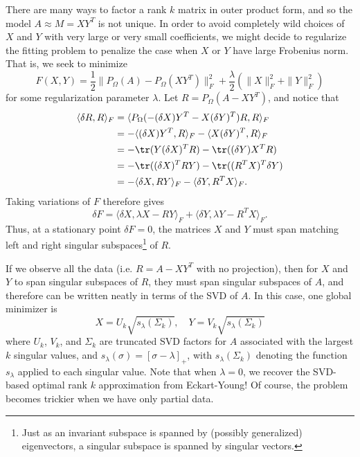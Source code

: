 \documentclass[12pt, leqno]{article} %
\begin{document}
There are many ways to factor a rank $k$ matrix in outer product
form, and so the model $A \approx M = XY^T$ is not unique.  In order
to avoid completely wild choices of $X$ and $Y$ with very large
or very small coefficients, we might decide to regularize the
fitting problem to penalize the case when $X$ or $Y$ have large
Frobenius norm.  That is, we seek to minimize
\[
  F(X,Y) =
    \frac{1}{2} \|P_{\Omega}(A)-P_{\Omega}(XY^T)\|_F^2 +
    \frac{\lambda}{2} \left( \|X\|_F^2 + \|Y\|_F^2 \right)
\]
for some regularization parameter $\lambda$.  Let
$R = P_{\Omega}(A-XY^T)$, and notice that
\begin{align*}
  \langle \delta R, R \rangle_F
  &= \langle P_{\Omega}(-(\delta X) Y^T - X(\delta Y)^T ) R, R \rangle_F \\
  &= -\langle (\delta X) Y^T, R \rangle_F -\langle X (\delta Y)^T, R \rangle_F \\
  &= -\tr(Y (\delta X)^T R)-\tr((\delta Y) X^T R) \\
  &= -\tr((\delta X)^T RY)-\tr((R^TX)^T \delta Y) \\
  &= -\langle \delta X, RY \rangle_F - \langle \delta Y, R^T X \rangle_F.
\end{align*}
Taking variations of $F$ therefore gives
\[
  \delta F =
    \langle \delta X, \lambda X - R   Y \rangle_F +
    \langle \delta Y, \lambda Y - R^T X \rangle_F.
\]
Thus, at a stationary point $\delta F = 0$,     
the matrices $X$ and $Y$ must span matching left and right
singular subspaces\footnote{%
  Just as an invariant subspace is spanned by (possibly generalized)
  eigenvectors, a singular subspace is spanned by singular vectors.
}
of $R$.

If we observe all the data (i.e. $R=A-XY^T$ with no projection),
then for $X$ and $Y$ to span singular subspaces of $R$, they must
span singular subspaces of $A$, and therefore can be written neatly
in terms of the SVD of $A$.  In this case, one global minimizer is
\[
  X = U_k \sqrt{s_{\lambda}(\Sigma_k)}, \quad Y = V_k \sqrt{s_{\lambda}(\Sigma_k)}
\]
where $U_k$, $V_k$, and $\Sigma_k$ are truncated SVD factors for
$A$ associated with the largest $k$ singular values,
and $s_{\lambda}(\sigma) = [\sigma-\lambda]_+$,
with $s_{\lambda}(\Sigma_k)$ denoting the function $s_{\lambda}$
applied to each singular value.  Note that when $\lambda = 0$,
we recover the SVD-based optimal rank $k$ approximation from
Eckart-Young!  Of course, the problem becomes
trickier when we have only partial data.
\end{document}
